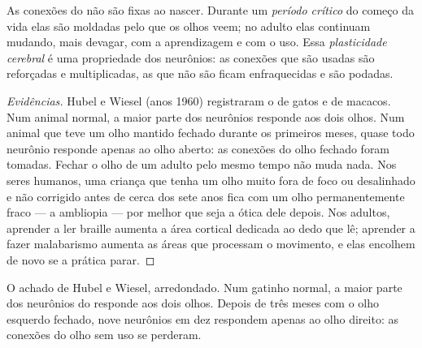 \begin{proposition}[A plasticidade]\label{prop:g11:vision-and-brain:plasticity}
As conexões do  não são fixas ao nascer. Durante um
\emph{período crítico} do começo da vida elas são moldadas pelo que os
olhos veem; no adulto elas continuam mudando, mais devagar, com a
aprendizagem e com o uso. Essa
\emph{plasticidade cerebral} é uma
propriedade dos neurônios: as conexões que são usadas são reforçadas e
multiplicadas, as que não são ficam enfraquecidas e são podadas.
\end{proposition}
\begin{proof}[Evidências]
Hubel e Wiesel (anos 1960) registraram o  de gatos e de
macacos. Num animal normal, a maior parte dos neurônios responde aos
dois olhos. Num animal que teve um olho mantido fechado durante os
primeiros meses, quase todo neurônio responde apenas ao olho aberto: as
conexões do olho fechado foram tomadas. Fechar o olho de um adulto pelo
mesmo tempo não muda nada. Nos seres humanos, uma criança que tenha um
olho muito fora de foco ou desalinhado e não corrigido antes de cerca
dos sete anos fica com um olho permanentemente fraco --- a ambliopia
--- por melhor que seja a ótica dele depois. Nos adultos, aprender a
ler braille aumenta a área cortical dedicada ao dedo que lê; aprender a
fazer malabarismo aumenta as áreas que processam o movimento, e elas
encolhem de novo se a prática parar.
\end{proof}

\begin{omfigure}

{\small O achado de Hubel e Wiesel, arredondado. Num gatinho normal, a
maior parte dos neurônios do  responde aos dois olhos.
Depois de três meses com o olho esquerdo fechado, nove neurônios em dez
respondem apenas ao olho direito: as conexões do olho sem uso se
perderam.}
\end{omfigure}

